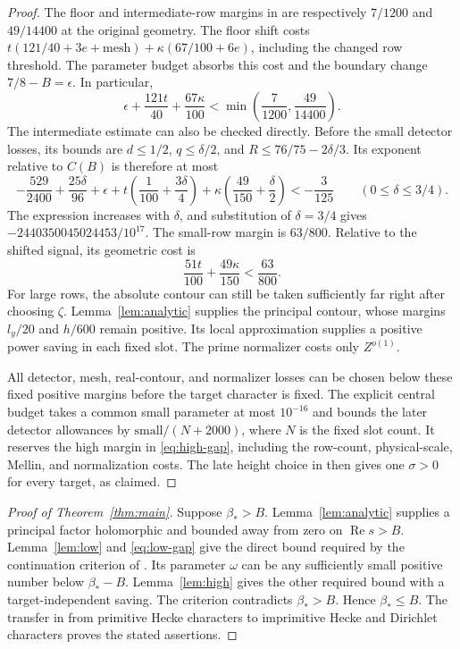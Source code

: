 \documentclass[11pt]{article}
\newcommand{\Ree}{\operatorname{Re}}
\begin{document}
\begin{proof}
The floor and intermediate-row margins in \cite{OAI} are respectively
$7/1200$ and $49/14400$ at the original geometry. The floor shift costs
$t(121/40+3e+\mathrm{mesh})+\kappa(67/100+6e)$,
including the changed row threshold. The
parameter budget absorbs this cost and the boundary change
$7/8-B=\epsilon$. In particular,
\[
 \epsilon+\frac{121t}{40}+\frac{67\kappa}{100}
 <\min\left(\frac7{1200},\frac{49}{14400}\right).
\]
The intermediate estimate can also be checked directly.
Before the small detector losses, its bounds are
$d\le1/2$, $q\le\delta/2$, and $R\le76/75-2\delta/3$.
Its exponent relative to $C(B)$ is therefore at most
\[
 -\frac{529}{2400}+\frac{25\delta}{96}+\epsilon
 +t\left(\frac1{100}+\frac{3\delta}{4}\right)
 +\kappa\left(\frac{49}{150}+\frac\delta2\right)
 <-\frac3{125}
 \qquad(0\le\delta\le3/4).
\]
The expression increases with $\delta$, and substitution of $\delta=3/4$
gives $-2440350045024453/10^{17}$.
The small-row margin is $63/800$.
Relative to the shifted signal, its geometric cost is
\[
 \frac{51t}{100}+\frac{49\kappa}{150}<\frac{63}{800}.
\]
For large rows, the absolute contour can still be taken sufficiently far
right after choosing $\zeta$. Lemma~\ref{lem:analytic} supplies the
principal contour, whose margins $l_y/20$ and $h/600$ remain positive.
Its local approximation supplies a positive power saving in each fixed
slot. The prime normalizer costs only $Z^{o(1)}$.

All detector, mesh, real-contour, and normalizer losses can be chosen
below these fixed positive margins before the target character is fixed.
The explicit central budget takes a common small parameter at most
$10^{-16}$ and bounds the later detector allowances by
$\mathrm{small}/(N+2000)$, where $N$ is the fixed slot count.
It reserves the high margin in \eqref{eq:high-gap}, including the row-count,
physical-scale, Mellin, and normalization costs.
The late height choice in \cite{OAI} then gives one $\sigma>0$ for every
target, as claimed.
\end{proof}

\begin{proof}[Proof of Theorem~\ref{thm:main}]
Suppose $\beta_*>B$. Lemma~\ref{lem:analytic} supplies a principal
factor holomorphic and bounded away from zero on $\Ree s>B$.
Lemma~\ref{lem:low} and \eqref{eq:low-gap} give the direct bound required
by the continuation criterion of \cite[Section 2]{OAI}. Its parameter
$\omega$ can be any sufficiently small positive number below
$\beta_*-B$. Lemma~\ref{lem:high} gives the other required bound with a
target-independent saving. The criterion contradicts $\beta_*>B$.
Hence $\beta_*\le B$. The transfer in \cite{OAI} from primitive Hecke
characters to imprimitive Hecke and Dirichlet characters proves the
stated assertions.
\end{proof}
\end{document}
